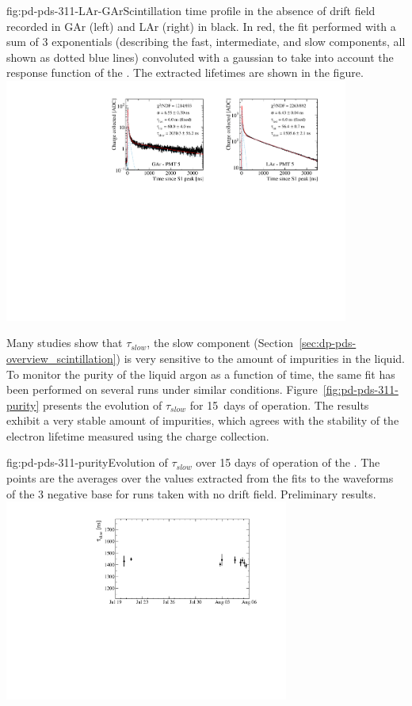 \begin{dunefigure}{fig:pd-pds-311-LAr-GAr}{Scintillation time profile in the absence of drift field recorded in GAr (left) and LAr (right) in black. In red, the fit performed with a sum of 3 exponentials (describing the fast, intermediate, and slow components, all shown as dotted blue lines) convoluted with a gaussian to take into account the response function of the . The extracted lifetimes are shown in the figure.}
\includegraphics[width=0.85\textwidth]{graphics/dppd_311_lar_gar_fit.pdf}
\end{dunefigure}

Many studies show that $\tau_{slow}$, the slow component (Section~\ref{sec:dp-pds-overview_scintillation}) is very sensitive to the amount of impurities in the liquid.
To monitor the purity of the liquid argon as a function of time, the same fit has been performed on several runs under similar conditions. 
Figure~\ref{fig:pd-pds-311-purity} presents the evolution of $\tau_{slow}$ for \SI{15}{days} of operation.
The results exhibit a very stable amount of impurities, which agrees with the stability of the electron lifetime measured using the charge collection.

\begin{dunefigure}{fig:pd-pds-311-purity}{Evolution of $\tau_{slow}$ over \num{15} days of operation of the . The points are the averages over the values extracted from the fits to the waveforms of the \num{3} negative base  for runs taken with no drift field. Preliminary results.}
\includegraphics[width=0.7\textwidth]{graphics/dppd_311_purity.pdf}
\end{dunefigure}

